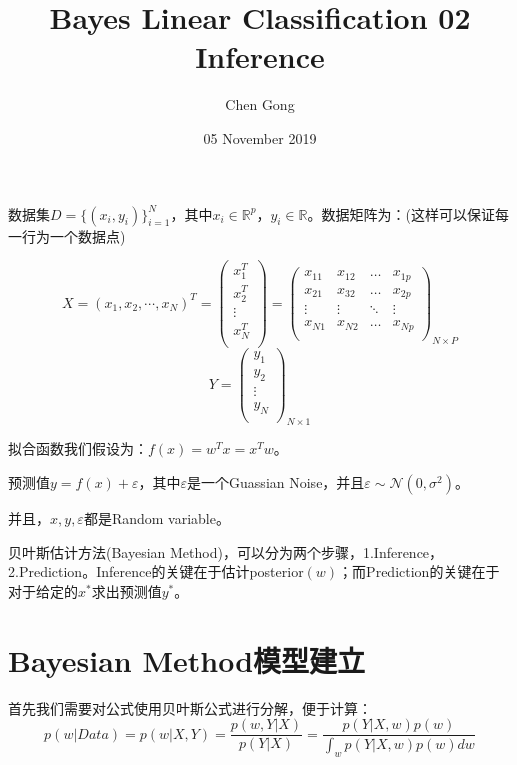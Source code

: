 \documentclass[a4paper]{article}
\title{Bayes Linear Classification 02 Inference}
\author{Chen Gong}
\date{05 November 2019}
\begin{document}
\maketitle

数据集$D=\{(x_i,y_i)\}^{N}_{i=1}$，其中$x_i\in\mathbb{R}^{p}$，$y_i\in\mathbb{R}$。数据矩阵为：(这样可以保证每一行为一个数据点)

\begin{equation}
    X=(x_1, x_2, \cdots, x_N)^T=
    \begin{pmatrix}
    x_1^T \\ 
    x_2^T \\
    \vdots\\
    x_N^T \\
    \end{pmatrix} =
    \begin{pmatrix}
    x_{11} & x_{12} & \dots & x_{1p}\\
    x_{21} & x_{32} & \dots & x_{2p}\\
    \vdots & \vdots & \ddots & \vdots\\
    x_{N1} & x_{N2} & \dots & x_{Np}\\
    \end{pmatrix}_{N\times P}
\end{equation}
\begin{equation}
    Y=
    \begin{pmatrix}
    y_1 \\ 
    y_2 \\
    \vdots\\
    y_N \\
    \end{pmatrix}_{N\times 1}
\end{equation}

拟合函数我们假设为：$f(x) = w^Tx = x^Tw$。

预测值$y=f(x)+\varepsilon$，其中$\varepsilon$是一个Guassian Noise，并且$\varepsilon \sim \mathcal{N}(0,\sigma^2)$。

并且，$x,y,\varepsilon$都是Random variable。

贝叶斯估计方法(Bayesian Method)，可以分为两个步骤，1.Inference，2.Prediction。Inference的关键在于估计posterior$(w)$；而Prediction的关键在于对于给定的$x^{\ast}$求出预测值$y^{\ast}$。

\section{Bayesian Method模型建立}
首先我们需要对公式使用贝叶斯公式进行分解，便于计算：
\begin{equation}
    p(w|Data) = p(w|X,Y) = \frac{p(w,Y|X)}{p(Y|X)} = \frac{p(Y|X,w)p(w)}{\int_w p(Y|X,w)p(w)dw}
\end{equation}
\end{document}
